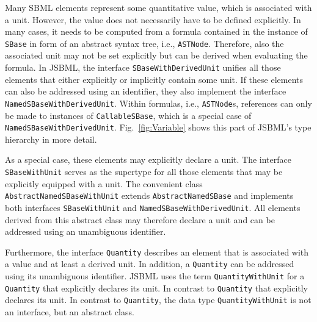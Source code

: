 Many SBML elements represent some quantitative value, which is associated with a
unit. However, the value does not necessarily have to be defined explicitly. In
many cases, it needs to be computed from a formula contained in the instance of
\texttt{SBase} in form of an abstract syntax tree, i.e., \texttt{ASTNode}.
%
Therefore, also the associated unit may not be set explicitly but can be derived
when evaluating the formula. In JSBML, the interface
\texttt{SBaseWithDerivedUnit}
%
unifies all those elements
that either explicitly or implicitly contain some unit. If these elements can
also be addressed using an identifier, they also implement the interface
\texttt{NamedSBaseWithDerivedUnit}.
%
Within formulas, i.e., \texttt{ASTNode}s,
references can only be made to instances of \texttt{CallableSBase},
%
which is a special case of \texttt{NamedSBaseWithDerivedUnit}.
Fig.~\vref{fig:Variable} shows this part of JSBML's type hierarchy in more
detail.

As a special case, these elements may explicitly declare a unit. The interface
\texttt{SBaseWithUnit}
%
serves as the supertype for all those elements that may
be explicitly equipped with a unit. The convenient class
\texttt{AbstractNamedSBaseWithUnit}
%
%
extends \texttt{AbstractNamedSBase} and
implements both interfaces \texttt{SBaseWithUnit} and
%
\texttt{NamedSBaseWithDerivedUnit}.
%
All elements derived from this abstract class may therefore declare a unit and
can be addressed using an unambiguous identifier.

Furthermore, the interface \texttt{Quantity}
%
describes an element that is associated with a value and at least a derived
unit. In addition, a \texttt{Quantity} can be addressed
using its unambiguous identifier. JSBML uses the term \texttt{QuantityWithUnit}
for a \texttt{Quantity} that explicitly declares its unit. In contrast to
\texttt{Quantity} that explicitly declares its unit. In contrast to
\texttt{Quantity}, the data type \texttt{QuantityWithUnit}
%
is not an interface, but an abstract class.

